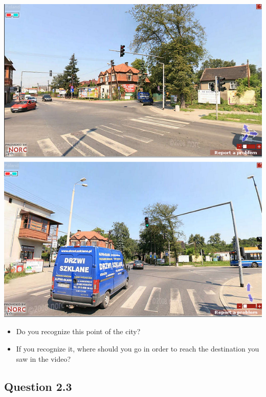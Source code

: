 \documentclass[12pt,a4paper,openright, notitlepage]{report}
\begin{document}
\includegraphics[width=\textwidth]{imgs/image-question22-1}
\includegraphics[width=\textwidth]{imgs/image-question22-2}

\begin{itemize}
	\item Do you recognize this point of the city?
	\item If you recognize it, where should you go in order to reach the destination you saw in the video?
\end{itemize}

\newpage

\subsection{Question 2.3}
\end{document}
